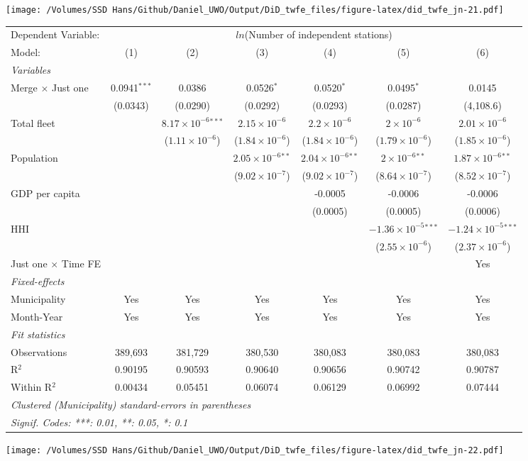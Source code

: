 \documentclass[
]{article}
\begin{document}
\texttt{[image: /Volumes/SSD Hans/Github/Daniel\_UWO/Output/DiD\_twfe\_files/figure-latex/did\_twfe\_jn-21.pdf]}

\begin{tabular}{lcccccc}
\tabularnewline\midrule\midrule
Dependent Variable:&\multicolumn{6}{c}{$ln$(Number of independent stations)}\\
Model:&(1) & (2) & (3) & (4) & (5) & (6)\\
\midrule \emph{Variables}&   &   &   &   &   &  \\
Merge $\times $ Just one & 0.0941$^{***}$ & 0.0386 & 0.0526$^{*}$ & 0.0520$^{*}$ & 0.0495$^{*}$ & 0.0145\\
  &(0.0343) & (0.0290) & (0.0292) & (0.0293) & (0.0287) & (4,108.6)\\
Total fleet &    & $8.17\times 10^{-6}$$^{***}$ & $2.15\times 10^{-6}$ & $2.2\times 10^{-6}$ & $2\times 10^{-6}$ & $2.01\times 10^{-6}$\\
  &   & ($1.11\times 10^{-6}$) & ($1.84\times 10^{-6}$) & ($1.84\times 10^{-6}$) & ($1.79\times 10^{-6}$) & ($1.85\times 10^{-6}$)\\
Population &    &    & $2.05\times 10^{-6}$$^{**}$ & $2.04\times 10^{-6}$$^{**}$ & $2\times 10^{-6}$$^{**}$ & $1.87\times 10^{-6}$$^{**}$\\
  &   &    & ($9.02\times 10^{-7}$) & ($9.02\times 10^{-7}$) & ($8.64\times 10^{-7}$) & ($8.52\times 10^{-7}$)\\
GDP per capita &    &    &    & -0.0005 & -0.0006 & -0.0006\\
  &   &    &    & (0.0005) & (0.0005) & (0.0006)\\
HHI &    &    &    &    & $-1.36\times 10^{-5}$$^{***}$ & $-1.24\times 10^{-5}$$^{***}$\\
  &   &    &    &    & ($2.55\times 10^{-6}$) & ($2.37\times 10^{-6}$)\\
Just one $\times$ Time FE &  &  &  &  &  & Yes\\
\midrule \emph{Fixed-effects}&   &   &   &   &   &  \\
Municipality & Yes & Yes & Yes & Yes & Yes & Yes\\
Month-Year & Yes & Yes & Yes & Yes & Yes & Yes\\
\midrule \emph{Fit statistics}&  & & & & & \\
Observations & 389,693&381,729&380,530&380,083&380,083&380,083\\
R$^2$ & 0.90195&0.90593&0.90640&0.90656&0.90742&0.90787\\
Within R$^2$ & 0.00434&0.05451&0.06074&0.06129&0.06992&0.07444\\
\midrule\midrule\multicolumn{7}{l}{\emph{Clustered (Municipality) standard-errors in parentheses}}\\
\multicolumn{7}{l}{\emph{Signif. Codes: ***: 0.01, **: 0.05, *: 0.1}}\\
\end{tabular}

\texttt{[image: /Volumes/SSD Hans/Github/Daniel\_UWO/Output/DiD\_twfe\_files/figure-latex/did\_twfe\_jn-22.pdf]}
\end{document}
